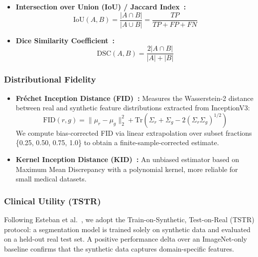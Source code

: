 \begin{itemize}
    \item \textbf{Intersection over Union (IoU) / Jaccard Index~\cite{jaccard1901etude}:}
    \begin{equation}
        \mathrm{IoU}(A, B) = \frac{|A \cap B|}{|A \cup B|} = \frac{TP}{TP + FP + FN}
    \end{equation}

    \item \textbf{Dice Similarity Coefficient~\cite{dice1945measures,sorensen1948method}:}
    \begin{equation}
        \mathrm{DSC}(A, B) = \frac{2 |A \cap B|}{|A| + |B|}
    \end{equation}
\end{itemize}

\subsubsection{Distributional Fidelity}

\begin{itemize}
    \item \textbf{Fréchet Inception Distance (FID)~\cite{heusel2017gans}:} Measures the Wasserstein-2 distance between real and synthetic feature distributions extracted from InceptionV3:
    \begin{equation}
        \mathrm{FID}(r, g) = \|\mu_r - \mu_g\|_2^2 + \mathrm{Tr}\!\left(\Sigma_r + \Sigma_g - 2(\Sigma_r \Sigma_g)^{1/2}\right)
    \end{equation}
    We compute bias-corrected FID via linear extrapolation over subset fractions \{0.25, 0.50, 0.75, 1.0\} to obtain a finite-sample-corrected estimate.

    \item \textbf{Kernel Inception Distance (KID)~\cite{binkowski2018demystifying}:} An unbiased estimator based on Maximum Mean Discrepancy with a polynomial kernel, more reliable for small medical datasets.
\end{itemize}

\subsubsection{Clinical Utility (TSTR)}
Following Esteban et al.~\cite{esteban2017real}, we adopt the Train-on-Synthetic, Test-on-Real (TSTR) protocol: a segmentation model is trained solely on synthetic data and evaluated on a held-out real test set. A positive performance delta over an ImageNet-only baseline confirms that the synthetic data captures domain-specific features.

